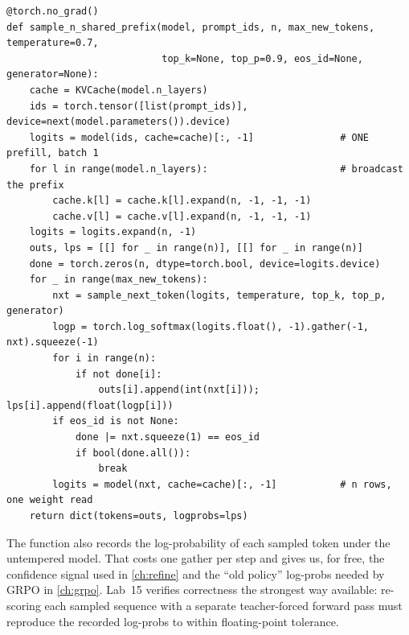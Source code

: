 \begin{lstlisting}[caption={Prefill once, fan out, decode $n$ samples as a batch (\texttt{llmsys/tts.py}).},label={lst:scaling:shared}]
@torch.no_grad()
def sample_n_shared_prefix(model, prompt_ids, n, max_new_tokens, temperature=0.7,
                           top_k=None, top_p=0.9, eos_id=None, generator=None):
    cache = KVCache(model.n_layers)
    ids = torch.tensor([list(prompt_ids)], device=next(model.parameters()).device)
    logits = model(ids, cache=cache)[:, -1]               # ONE prefill, batch 1
    for l in range(model.n_layers):                       # broadcast the prefix
        cache.k[l] = cache.k[l].expand(n, -1, -1, -1)
        cache.v[l] = cache.v[l].expand(n, -1, -1, -1)
    logits = logits.expand(n, -1)
    outs, lps = [[] for _ in range(n)], [[] for _ in range(n)]
    done = torch.zeros(n, dtype=torch.bool, device=logits.device)
    for _ in range(max_new_tokens):
        nxt = sample_next_token(logits, temperature, top_k, top_p, generator)
        logp = torch.log_softmax(logits.float(), -1).gather(-1, nxt).squeeze(-1)
        for i in range(n):
            if not done[i]:
                outs[i].append(int(nxt[i])); lps[i].append(float(logp[i]))
        if eos_id is not None:
            done |= nxt.squeeze(1) == eos_id
            if bool(done.all()):
                break
        logits = model(nxt, cache=cache)[:, -1]           # n rows, one weight read
    return dict(tokens=outs, logprobs=lps)
\end{lstlisting}

The function also records the log-probability of each sampled token under the untempered model.
That costs one gather per step and gives us, for free, the confidence signal used in
\cref{ch:refine} and the ``old policy'' log-probs needed by GRPO in \cref{ch:grpo}. Lab~15 verifies
correctness the strongest way available: re-scoring each sampled sequence with a separate
teacher-forced forward pass must reproduce the recorded log-probs to within floating-point
tolerance.

